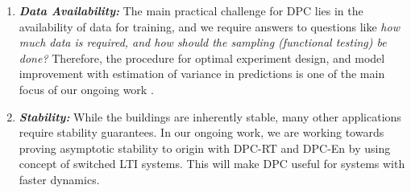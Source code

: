 \begin{enumerate}
\item \emph{\textbf{Data Availability:}} \textcolor[rgb]{0,0,1}{The main practical challenge for DPC lies in the availability of data for training, and we require answers to questions like \emph{how much data is required, and how should the sampling (functional testing) be done?} Therefore, the procedure for optimal experiment design, and model improvement with estimation of variance in predictions is one of the main focus of our ongoing work \cite{JainICCPS2018}}.
\item \emph{\textbf{Stability:}} While the buildings are inherently stable, many other applications require stability guarantees. In our ongoing work, we are working towards proving asymptotic stability to origin with DPC-RT and DPC-En by using concept of switched LTI systems. This will make DPC useful for systems with faster dynamics.
\end{enumerate}